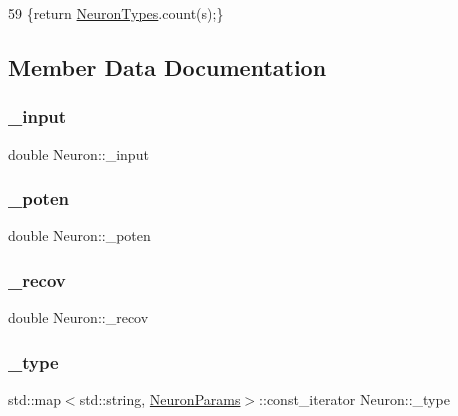 \begin{DoxyCode}
59 \{\textcolor{keywordflow}{return} \hyperlink{classNeuron_ab4b47274e756b72923d2f8a9a5037d23}{NeuronTypes}.count(s);\}
\end{DoxyCode}


\subsection{Member Data Documentation}
\mbox{\label{classNeuron_ac1311b3b22122a67743615ee40caba6d}} 
\subsubsection{\texorpdfstring{\+\_\+input}{\_input}}
{\footnotesize\ttfamily double Neuron\+::\+\_\+input\hspace{0.3cm}{\ttfamily [private]}}

\mbox{\label{classNeuron_a7f7fdc3f9550b870351c60f618c11376}} 
\subsubsection{\texorpdfstring{\+\_\+poten}{\_poten}}
{\footnotesize\ttfamily double Neuron\+::\+\_\+poten\hspace{0.3cm}{\ttfamily [private]}}

\mbox{\label{classNeuron_a7bc9f5b85125f2c2596b64766796002b}} 
\subsubsection{\texorpdfstring{\+\_\+recov}{\_recov}}
{\footnotesize\ttfamily double Neuron\+::\+\_\+recov\hspace{0.3cm}{\ttfamily [private]}}

\mbox{\label{classNeuron_af48de7c2ad739fc5d57bfa2f3b1f7663}} 
\subsubsection{\texorpdfstring{\+\_\+type}{\_type}}
{\footnotesize\ttfamily std\+::map$<$std\+::string, \hyperlink{structNeuronParams}{Neuron\+Params}$>$\+::const\+\_\+iterator Neuron\+::\+\_\+type\hspace{0.3cm}{\ttfamily [private]}}

